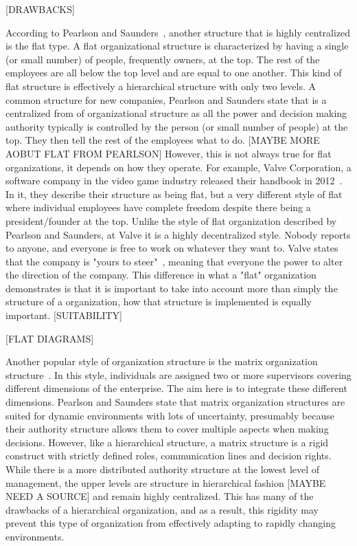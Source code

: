 [DRAWBACKS]

According to Pearlson and Saunders~\cite{pearlson2009}, another structure that is highly centralized is the flat type. A flat organizational structure is characterized by having a single (or small number) of people, frequently owners, at the top. The rest of the employees are all below the top level and are equal to one another. This kind of flat structure is effectively a hierarchical structure with only two levels. A common structure for new companies, Pearlson and Saunders state that is a centralized from of organizational structure as all the power and decision making authority typically is controlled by the person (or small number of people) at the top. They then tell the rest of the employees what to do. [MAYBE MORE AOBUT FLAT FROM PEARLSON] However, this is not always true for flat organizations, it depends on how they operate. For example, Valve Corporation, a software company in the video game industry released their handbook in 2012~\cite{valveHandbook}. In it, they describe their structure as being flat, but a very different style of flat where individual employees have complete freedom despite there being a president/founder at the top. Unlike the style of flat organization described by Pearlson and Saunders, at Valve it is a highly decentralized style. Nobody reports to anyone, and everyone is free to work on whatever they want to. Valve states that the company is "yours to steer"~\cite{valveHandbook}, meaning that everyone the power to alter the direction of the company. This difference in what a "flat" organization demonstrates is that it is important to take into account more than simply the structure of a organization, how that structure is implemented is equally important. 
[SUITABILITY]

[FLAT DIAGRAMS]

Another popular style of organization structure is the matrix organization structure~\cite{pearlson2009}. In this style, individuals are assigned two or more supervisors covering different dimensions of the enterprise. The aim here is to integrate these different dimensions. Pearlson and Saunders state that matrix organization structures are suited for dynamic environments with lots of uncertainty, presumably because their authority structure allows them to cover multiple aspects when making decisions. However, like a hierarchical structure, a matrix structure is a rigid construct with strictly defined roles, communication lines and decision rights. While there is a more distributed authority structure at the lowest level of management, the upper levels are structure in hierarchical fashion [MAYBE NEED A SOURCE] and remain highly centralized. This has many of the drawbacks of a hierarchical organization, and as a result, this rigidity may prevent this type of organization from effectively adapting to rapidly changing environments. 

